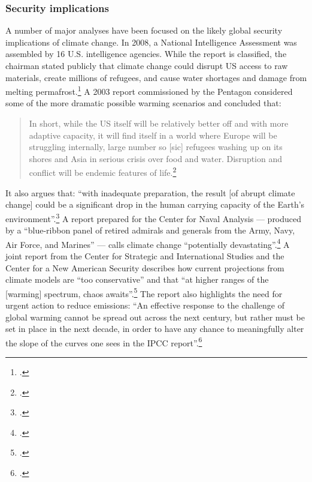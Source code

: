	\subsubsection{Security implications}
	
	
	
A number of major analyses have been focused on the likely global security implications of climate change.
In 2008, a National Intelligence Assessment was assembled by 16 U.S. intelligence agencies.
While the report is classified, the chairman stated publicly that climate change could disrupt US access to raw materials, create millions of refugees, and cause water shortages and damage from melting permafrost.\footcite[][]{Craven}
A 2003 report commissioned by the Pentagon considered some of the more dramatic possible warming scenarios and concluded that:
\begin{quote}
In short, while the US itself will be relatively better off and with more adaptive capacity, it will find itself in a world where Europe will be struggling internally, large number so [sic] refugees washing up on its shores and Asia in serious crisis over food and water. Disruption and conflict will be endemic features of life.\footcite[][p. 22]{AbruptCCScenario}
\end{quote}
It also argues that: ``with inadequate preparation, the result [of abrupt climate change] could be a significant drop in the human carrying capacity of the Earth’s environment''.\footcite[][p. 1]{AbruptCCScenario}
A report prepared for the Center for Naval Analysis --- produced by a ``blue-ribbon panel of retired admirals and generals from the Army, Navy, Air Force, and Marines'' --- calls climate change ``potentially devastating''.\footcite[][p. 3]{NationalSecurityCC}
A joint report from the Center for Strategic and International Studies and the Center for a New American Security describes how current projections from climate models are ``too conservative'' and that ``at higher ranges of the [warming] spectrum, chaos awaits''.\footcite[][p. 78]{AgeOfConsequences}
The report also highlights the need for urgent action to reduce emissions: ``An effective response to the challenge of global warming cannot be spread out across the next century, but rather must be set in place in the next decade, in order to have any chance to meaningfully alter the slope of the curves one sees in the IPCC report''.\footcite[][p. 78]{AgeOfConsequences}



